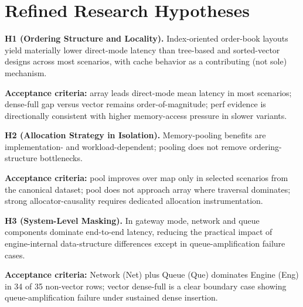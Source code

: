 \section*{Refined Research Hypotheses}

\textbf{H1 (Ordering Structure and Locality).} Index-oriented order-book layouts yield materially lower direct-mode latency than tree-based and sorted-vector designs across most scenarios, with cache behavior as a contributing (not sole) mechanism.

\textbf{Acceptance criteria:} array leads direct-mode mean latency in most scenarios; dense-full gap versus vector remains order-of-magnitude; perf evidence is directionally consistent with higher memory-access pressure in slower variants.

\textbf{H2 (Allocation Strategy in Isolation).} Memory-pooling benefits are implementation- and workload-dependent; pooling does not remove ordering-structure bottlenecks.

\textbf{Acceptance criteria:} pool improves over map only in selected scenarios from the canonical dataset; pool does not approach array where traversal dominates; strong allocator-causality requires dedicated allocation instrumentation.

\textbf{H3 (System-Level Masking).} In gateway mode, network and queue components dominate end-to-end latency, reducing the practical impact of engine-internal data-structure differences except in queue-amplification failure cases.

\textbf{Acceptance criteria:} Network (Net) plus Queue (Que) dominates Engine (Eng) in 34 of 35 non-vector rows; vector dense-full is a clear boundary case showing queue-amplification failure under sustained dense insertion.
